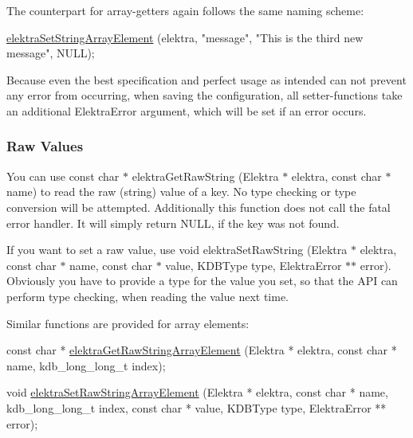 The counterpart for array-\/getters again follows the same naming scheme\+:


\begin{DoxyCode}
\hyperlink{group__highlevel_gaa5bba7a5c811437562d947420034fd03}{elektraSetStringArrayElement} (elektra, \textcolor{stringliteral}{"message"}, \textcolor{stringliteral}{"This is the third new
       message"}, NULL);
\end{DoxyCode}


Because even the best specification and perfect usage as intended can not prevent any error from occurring, when saving the configuration, all setter-\/functions take an additional {\ttfamily Elektra\+Error} argument, which will be set if an error occurs.

\subsubsection*{Raw Values}

You can use {\ttfamily const char $\ast$ elektra\+Get\+Raw\+String (Elektra $\ast$ elektra, const char $\ast$ name)} to read the raw (string) value of a key. No type checking or type conversion will be attempted. Additionally this function does not call the fatal error handler. It will simply return {\ttfamily N\+U\+LL}, if the key was not found.

If you want to set a raw value, use {\ttfamily void elektra\+Set\+Raw\+String (Elektra $\ast$ elektra, const char $\ast$ name, const char $\ast$ value, K\+D\+B\+Type type, Elektra\+Error $\ast$$\ast$ error)}. Obviously you have to provide a type for the value you set, so that the A\+PI can perform type checking, when reading the value next time.

Similar functions are provided for array elements\+:


\begin{DoxyCode}
\textcolor{keyword}{const} \textcolor{keywordtype}{char} * \hyperlink{group__highlevel_ga1b704f49a8e87262b670cd191ba61bb3}{elektraGetRawStringArrayElement} (Elektra * elektra, \textcolor{keyword}{const} \textcolor{keywordtype}{char} 
      * name, kdb\_long\_long\_t index);

\textcolor{keywordtype}{void} \hyperlink{group__highlevel_ga965e0b2ce7d5e8938965259c3f584600}{elektraSetRawStringArrayElement} (Elektra * elektra, \textcolor{keyword}{const} \textcolor{keywordtype}{char} * name, 
      kdb\_long\_long\_t index, \textcolor{keyword}{const} \textcolor{keywordtype}{char} * value, KDBType type, ElektraError ** error);
\end{DoxyCode}


